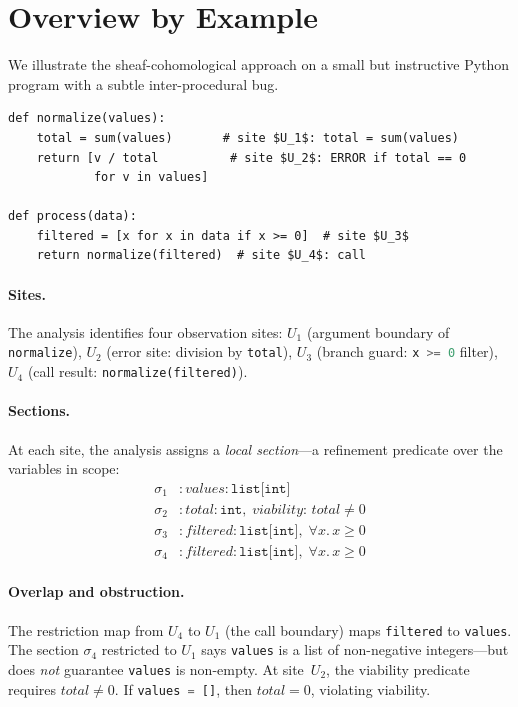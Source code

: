 \documentclass[acmsmall,screen,review,anonymous]{acmart}
\theoremstyle{remark}
\newcommand{\py}[1]{\lstinline[language=Python]{#1}}
\begin{document}
\section{Overview by Example}\label{sec:overview}

We illustrate the sheaf-cohomological approach on a small but
instructive Python program with a subtle inter-procedural bug.

\begin{lstlisting}
def normalize(values):
    total = sum(values)       # site $U_1$: total = sum(values)
    return [v / total          # site $U_2$: ERROR if total == 0
            for v in values]

def process(data):
    filtered = [x for x in data if x >= 0]  # site $U_3$
    return normalize(filtered)  # site $U_4$: call
\end{lstlisting}

\paragraph{Sites.}
The analysis identifies four observation sites:
$U_1$ (argument boundary of \py{normalize}),
$U_2$ (error site: division by \py{total}),
$U_3$ (branch guard: \py{x >= 0} filter),
$U_4$ (call result: \py{normalize(filtered)}).

\paragraph{Sections.}
At each site, the analysis assigns a \emph{local section}---a
refinement predicate over the variables in scope:
\begin{align*}
  \sigma_1 &: \mathit{values} : \texttt{list[int]} \\
  \sigma_2 &: \mathit{total} : \texttt{int},\; \textit{viability: } \mathit{total} \neq 0 \\
  \sigma_3 &: \mathit{filtered} : \texttt{list[int]},\; \forall x.\, x \geq 0 \\
  \sigma_4 &: \mathit{filtered} : \texttt{list[int]},\; \forall x.\, x \geq 0
\end{align*}

\paragraph{Overlap and obstruction.}
The restriction map from $U_4$ to $U_1$ (the call boundary) maps
\py{filtered} to \py{values}.  The section $\sigma_4$ restricted to
$U_1$ says \py{values} is a list of non-negative integers---but does
\emph{not} guarantee \py{values} is non-empty.  At site~$U_2$, the
viability predicate requires $\mathit{total} \neq 0$.  If
\py{values = []}, then $\mathit{total} = 0$, violating viability.
\end{document}
